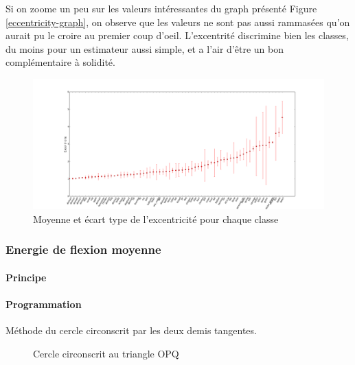 \documentclass{article}
\theoremstyle{definition}
\begin{document}
	  Si on zoome un peu sur les valeurs intéressantes du graph présenté Figure \ref{eccentricity-graph}, on observe que les valeurs ne sont pas aussi rammasées qu'on aurait pu le croire au premier coup d'oeil. L'excentrité discrimine bien les classes, du moins pour un estimateur aussi simple, et a l'air d'être un bon complémentaire à solidité.
	  
	  \begin{figure}[!h]
	    \begin{bigcenter}
	      \includegraphics[scale=0.38]{Graphes/eccentricitybis.png}
	    \end{bigcenter}
	    \caption{Moyenne et écart type de l'excentricité pour chaque classe}
	    \label{eccentricity-graph-2}
	  \end{figure}
      
      \subsubsection{Energie de flexion moyenne}
      
	\paragraph{Principe}
	
	\paragraph{Programmation}
	
	  Méthode du cercle circonscrit par les deux demis tangentes.
	  
	  \begin{figure}[!h]
	    \centering
	    \caption{Cercle circonscrit au triangle OPQ}
	    \label{cercle-circonscrit}
	  \end{figure}
	  
\end{document}
